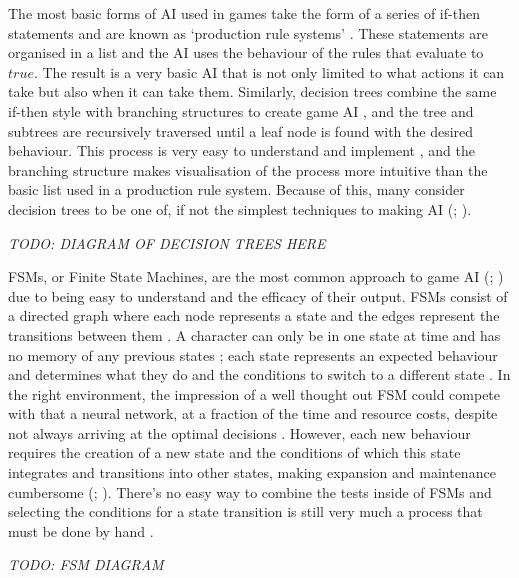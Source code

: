 \documentclass[11pt, a4paper]{report}
\begin{document}
The most basic forms of AI used in games take the form of a series of if-then statements and are known as `production rule systems' \parencite{tozour2002evolution}. These statements are organised in a list and the AI uses the behaviour of the rules that evaluate to $true$. The result is a very basic AI that is not only limited to what actions it can take but also when it can take them. Similarly, decision trees combine the same if-then style with branching structures to create game AI \parencite[62]{nareyek2004ai}, and the tree and subtrees are recursively traversed until a leaf node is found with the desired behaviour. This process is very easy to understand and implement \parencite[295]{millington2019ai}, and the branching structure makes visualisation of the process more intuitive than the basic list used in a production rule system. Because of this, many consider decision trees to be one of, if not the simplest techniques to making AI  (\cite[295]{millington2019ai}; \cite[7]{tozour2002evolution}).

\emph{TODO: DIAGRAM OF DECISION TREES HERE}

FSMs, or Finite State Machines, are the most common approach to game AI (\cite[1]{orkin2006three}; \cite[309]{millington2019ai}) due to being easy to understand and the efficacy of their output. FSMs consist of a directed graph where each node represents a state and the edges represent the transitions between them \parencite[6]{tozour2002evolution}. A character can only be in one state at time and has no memory of any previous states \parencite{colledanchise2014performance}; each state represents an expected behaviour and determines what they do and the conditions to switch to a different state \parencite[3]{diller2004behavior}. In the right environment, the impression of a well thought out FSM could compete with that a neural network, at a fraction of the time and resource costs, despite not always arriving at the optimal decisions \parencite{sweetser2002current}. However, each new behaviour requires the creation of a new state and the conditions of which this state integrates and transitions into other states, making expansion and maintenance cumbersome (\cite[2]{sweetser2002current}; \cite[3]{lim2010evolving}). There's no easy way to combine the tests inside of FSMs and selecting the conditions for a state transition is still very much a process that must be done by hand \parencite[313]{millington2019ai}. 

\emph{TODO: FSM DIAGRAM}
\end{document}
